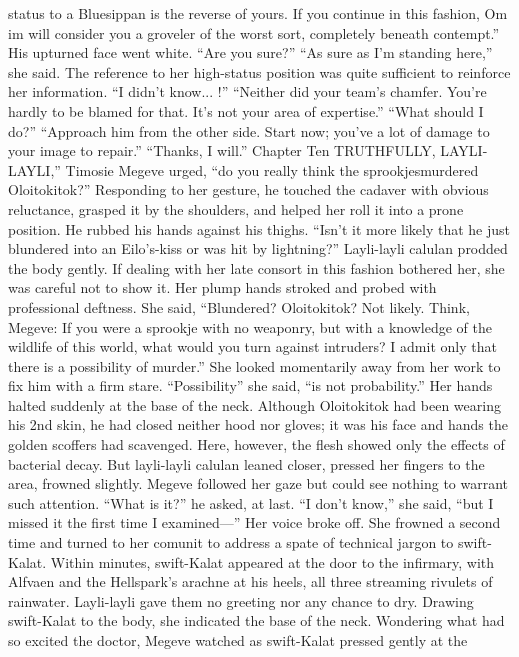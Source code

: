 \documentclass[9pt]{article}
\begin{document}
status to a Bluesippan is the reverse of yours. If you continue in this fashion, Om im will consider you a
groveler of the worst sort, completely beneath contempt.”
His upturned face went white. “Are you sure?”
“As sure as I’m standing here,” she said. The reference to her high-status position was quite sufficient
to reinforce her information.
“I didn’t know... !”
“Neither did your team’s chamfer. You’re hardly to be blamed for that. It’s not your area of
expertise.”
“What should I do?”
“Approach him from the other side. Start now; you’ve a lot of damage to your image to repair.”
“Thanks, I will.”
Chapter Ten
TRUTHFULLY, LAYLI-LAYLI,” Timosie Megeve urged, “do you really think the sprookjesmurdered Oloitokitok?” Responding to her gesture, he touched the cadaver with obvious reluctance,
grasped it by the shoulders, and helped her roll it into a prone position. He rubbed his hands against his
thighs. “Isn’t it more likely that he just blundered into an Eilo’s-kiss or was hit by lightning?”
Layli-layli calulan prodded the body gently. If dealing with her late consort in this fashion bothered
her, she was careful not to show it. Her plump hands stroked and probed with professional deftness. She
said, “Blundered? Oloitokitok? Not likely. Think, Megeve: If you were a sprookje with no weaponry,
but with a knowledge of the wildlife of this world, what would you turn against intruders? I admit only
that there is a possibility of murder.”
She looked momentarily away from her work to fix him with a firm stare. “Possibility” she said, “is
not probability.”
Her hands halted suddenly at the base of the neck. Although Oloitokitok had been wearing his 2nd
skin, he had closed neither hood nor gloves; it was his face and hands the golden scoffers had scavenged.
Here, however, the flesh showed only the effects of bacterial decay.
But layli-layli calulan leaned closer, pressed her fingers to the area, frowned slightly.
Megeve followed her gaze but could see nothing to warrant such attention. “What is it?” he asked, at
last.
“I don’t know,” she said, “but I missed it the first time I examined—” Her voice broke off. She
frowned a second time and turned to her comunit to address a spate of technical jargon to swift-Kalat.
Within minutes, swift-Kalat appeared at the door to the infirmary, with Alfvaen and the Hellspark’s
arachne at his heels, all three streaming rivulets of rainwater. Layli-layli gave them no greeting nor any
chance to dry. Drawing swift-Kalat to the body, she indicated the base of the neck.
Wondering what had so excited the doctor, Megeve watched as swift-Kalat pressed gently at the
\end{document}
